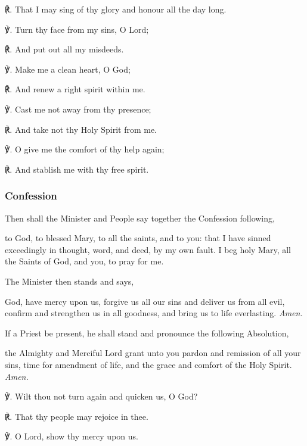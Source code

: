 \begin{multicols}{2}
℟. That I may sing of thy glory and honour all the day long.

℣. Turn thy face from my sins, O Lord;

℟. And put out all my misdeeds.

℣. Make me a clean heart, O God;

℟. And renew a right spirit within me.

℣. Cast me not away from thy presence;

℟. And take not thy Holy Spirit from me.

℣. O give me the comfort of thy help again;

℟. And stablish me with thy free spirit.

\subsubsection{Confession}
\begin{rubric}
	Then shall the Minister and People say together the Confession following,
\end{rubric}
 to God, to blessed Mary, to all the saints, and to you: that I have sinned exceedingly in thought, word, and deed, by my own fault. I beg holy Mary, all the Saints of God, and you, to pray for me.

\begin{rubric}
	The Minister then stands and says,
\end{rubric}

 God, have mercy upon us, forgive us all our sins and deliver us from all evil, confirm and strengthen us in all goodness, and bring us to life everlasting. \textit{Amen.}

\begin{rubric}
	If a Priest be present, he shall stand and pronounce the following Absolution,
\end{rubric}

 the Almighty and Merciful Lord grant unto you pardon {} and remission of all your sins, time for amendment of life, and the grace and comfort of the Holy Spirit. \textit{Amen.}

℣. Wilt thou not turn again and quicken us, O God?

℟. That thy people may rejoice in thee.

℣. O Lord, show thy mercy upon us.


\end{multicols}
